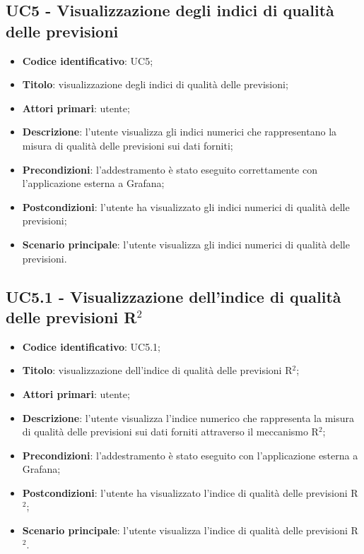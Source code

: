\subsection{UC5 - Visualizzazione degli indici di qualità delle previsioni}
\begin{itemize}
	\item \textbf{Codice identificativo}: UC5;
	\item \textbf{Titolo}: visualizzazione degli indici di qualità delle previsioni;
	\item \textbf{Attori primari}: utente;
	\item \textbf{Descrizione}: l'utente visualizza gli indici numerici che rappresentano la misura di qualità delle previsioni sui dati forniti;
	\item \textbf{Precondizioni}: l'addestramento è stato eseguito correttamente con l'applicazione esterna a Grafana\glo;
	\item \textbf{Postcondizioni}: l'utente ha visualizzato gli indici numerici di qualità delle previsioni;
	\item \textbf{Scenario principale}: l'utente visualizza gli indici numerici di qualità delle previsioni.
\end{itemize} 
\subsection{UC5.1 - Visualizzazione dell'indice di qualità delle previsioni R$^{2}$}
\begin{itemize}
	\item \textbf{Codice identificativo}: UC5.1;
	\item \textbf{Titolo}: visualizzazione dell'indice di qualità delle previsioni R$^{2}$\glo;
	\item \textbf{Attori primari}: utente;
	\item \textbf{Descrizione}: l'utente visualizza l'indice numerico che rappresenta la misura di qualità delle previsioni sui dati forniti attraverso il meccanismo R$^{2}$\glo;
	\item \textbf{Precondizioni}: l'addestramento è stato eseguito con l'applicazione esterna a Grafana\glo;
	\item \textbf{Postcondizioni}: l'utente ha visualizzato l'indice di qualità delle previsioni R$^{2}$\glo;
	\item \textbf{Scenario principale}: l'utente visualizza l'indice di qualità delle previsioni R$^{2}$\glo.
\end{itemize} 
